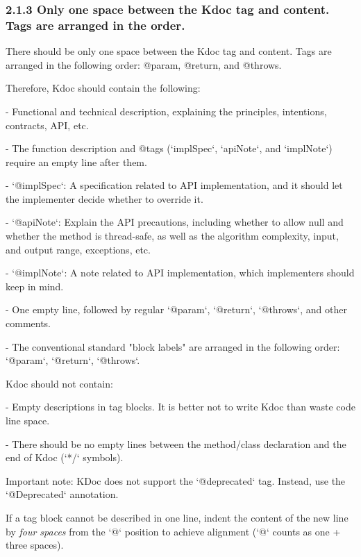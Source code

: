 \subsubsection*{\textbf{2.1.3 Only one space between the Kdoc tag and content. Tags are arranged in the order.}}
\leavevmode\newline

\label{sec:2.1.3}



There should be only one space between the Kdoc tag and content. Tags are arranged in the following order: @param, @return, and @throws.



Therefore, Kdoc should contain the following:

- Functional and technical description, explaining the principles, intentions, contracts, API, etc.

- The function description and @tags (`implSpec`, `apiNote`, and `implNote`) require an empty line after them.

- `@implSpec`: A specification related to API implementation, and it should let the implementer decide whether to override it.

- `@apiNote`: Explain the API precautions, including whether to allow null and whether the method is thread-safe, as well as the algorithm complexity, input, and output range, exceptions, etc.

- `@implNote`: A note related to API implementation, which implementers should keep in mind.

- One empty line, followed by regular `@param`, `@return`, `@throws`, and other comments.

- The conventional standard "block labels" are arranged in the following order: `@param`, `@return`, `@throws`.

Kdoc should not contain:

- Empty descriptions in tag blocks. It is better not to write Kdoc than waste code line space.

- There should be no empty lines between the method/class declaration and the end of Kdoc (`*/` symbols).

Important note: KDoc does not support the `@deprecated` tag. Instead, use the `@Deprecated` annotation.

 

If a tag block cannot be described in one line, indent the content of the new line by \textit{four spaces} from the `@` position to achieve alignment (`@` counts as one + three spaces).


